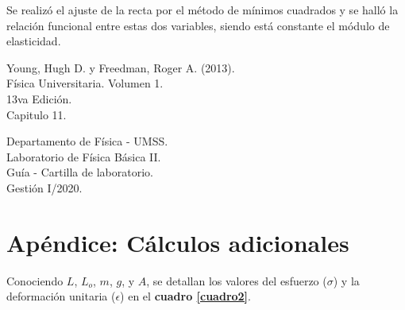 \documentclass[letter,11pt]{article}
\begin{document}
Se realizó el ajuste de la recta por el método de mínimos cuadrados y se halló
la relación funcional entre estas dos variables, siendo está constante el
módulo de elasticidad.

\begin{thebibliography}{99}

 Young, Hugh D. y Freedman, Roger A. (2013).\\
Física Universitaria. Volumen 1.\\
13va Edición.\\
Capitulo 11.

 Departamento de Física - UMSS.\\
Laboratorio de Física Básica II.\\
Guía - Cartilla de laboratorio.\\
Gestión I/2020.

\end{thebibliography}

\newpage
\section*{Apéndice: Cálculos adicionales}

Conociendo $L$, $L_o$, $m$, $g$, y $A$, se detallan los valores del esfuerzo
($\sigma$) y la deformación unitaria ($\epsilon$) en el
\textbf{cuadro \ref{cuadro2}}.
\end{document}
